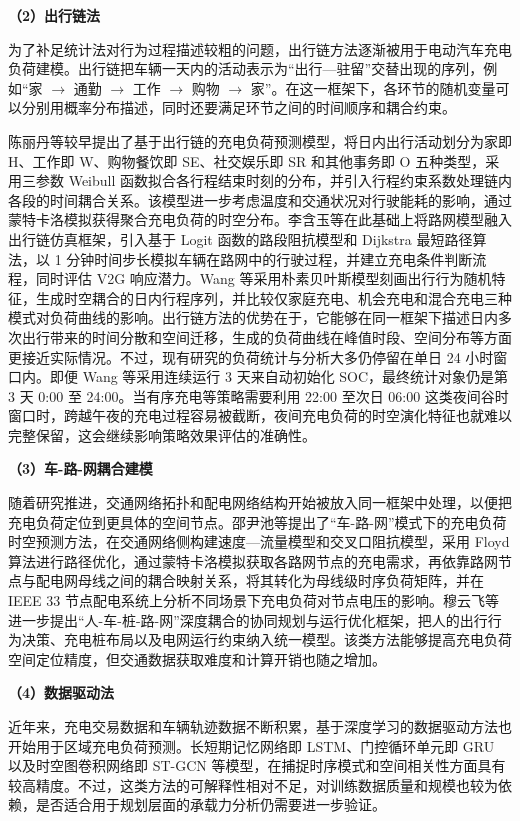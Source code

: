 \documentclass[10pt,a4paper]{article}
\numberwithin{equation}{section}
\numberwithin{table}{section}
\numberwithin{figure}{section}
\begin{document}
    \noindent\textbf{（2）出行链法}

    为了补足统计法对行为过程描述较粗的问题，出行链方法逐渐被用于电动汽车充电负荷建模。出行链把车辆一天内的活动表示为“出行—驻留”交替出现的序列，例如“家 $\rightarrow$ 通勤 $\rightarrow$ 工作 $\rightarrow$ 购物 $\rightarrow$ 家”。在这一框架下，各环节的随机变量可以分别用概率分布描述，同时还要满足环节之间的时间顺序和耦合约束。

    陈丽丹等\supercite{ref9}较早提出了基于出行链的充电负荷预测模型，将日内出行活动划分为家即 H、工作即 W、购物餐饮即 SE、社交娱乐即 SR 和其他事务即 O 五种类型，采用三参数 Weibull 函数拟合各行程结束时刻的分布，并引入行程约束系数处理链内各段的时间耦合关系。该模型进一步考虑温度和交通状况对行驶能耗的影响，通过蒙特卡洛模拟获得聚合充电负荷的时空分布。李含玉等\supercite{ref10}在此基础上将路网模型融入出行链仿真框架，引入基于 Logit 函数的路段阻抗模型和 Dijkstra 最短路径算法，以 1 分钟时间步长模拟车辆在路网中的行驶过程，并建立充电条件判断流程，同时评估 V2G 响应潜力。Wang 等\supercite{ref11}采用朴素贝叶斯模型刻画出行行为随机特征，生成时空耦合的日内行程序列，并比较仅家庭充电、机会充电和混合充电三种模式对负荷曲线的影响。出行链方法的优势在于，它能够在同一框架下描述日内多次出行带来的时间分散和空间迁移，生成的负荷曲线在峰值时段、空间分布等方面更接近实际情况。不过，现有研究的负荷统计与分析大多仍停留在单日 24 小时窗口内。即便 Wang 等\supercite{ref11}采用连续运行 3 天来自动初始化 SOC，最终统计对象仍是第 3 天 0:00 至 24:00。当有序充电等策略需要利用 22:00 至次日 06:00 这类夜间谷时窗口时，跨越午夜的充电过程容易被截断，夜间充电负荷的时空演化特征也就难以完整保留，这会继续影响策略效果评估的准确性。

    \noindent\textbf{（3）车-路-网耦合建模}

    随着研究推进，交通网络拓扑和配电网络结构开始被放入同一框架中处理，以便把充电负荷定位到更具体的空间节点。邵尹池等\supercite{ref4}提出了“车-路-网”模式下的充电负荷时空预测方法，在交通网络侧构建速度—流量模型和交叉口阻抗模型，采用 Floyd 算法进行路径优化，通过蒙特卡洛模拟获取各路网节点的充电需求，再依靠路网节点与配电网母线之间的耦合映射关系，将其转化为母线级时序负荷矩阵，并在 IEEE 33 节点配电系统上分析不同场景下充电负荷对节点电压的影响。穆云飞等\supercite{ref12}进一步提出“人-车-桩-路-网”深度耦合的协同规划与运行优化框架，把人的出行行为决策、充电桩布局以及电网运行约束纳入统一模型。该类方法能够提高充电负荷空间定位精度，但交通数据获取难度和计算开销也随之增加。

    \noindent\textbf{（4）数据驱动法}

    近年来，充电交易数据和车辆轨迹数据不断积累，基于深度学习的数据驱动方法也开始用于区域充电负荷预测。长短期记忆网络即 LSTM、门控循环单元即 GRU 以及时空图卷积网络即 ST-GCN 等模型，在捕捉时序模式和空间相关性方面具有较高精度。不过，这类方法的可解释性相对不足，对训练数据质量和规模也较为依赖，是否适合用于规划层面的承载力分析仍需要进一步验证\supercite{ref2}。
\end{document}
